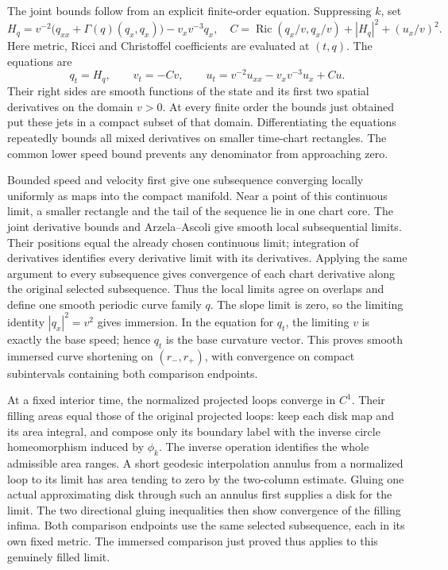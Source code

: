 The joint bounds follow from an explicit finite-order equation.
Suppressing $k$, set
\[
 H_q=v^{-2}\bigl(q_{xx}+\Gamma(q)(q_x,q_x)\bigr)
                  -v_xv^{-3}q_x,
 \quad C=\operatorname{Ric}(q_x/v,q_x/v)
                  +|H_q|^2+(u_x/v)^2.
\]
Here metric, Ricci and Christoffel coefficients are evaluated
at $(t,q)$.  The equations are
\[
 q_t=H_q,\qquad v_t=-Cv,\qquad
 u_t=v^{-2}u_{xx}-v_xv^{-3}u_x+Cu.
\]
Their right sides are smooth functions of the state and its
first two spatial derivatives on the domain $v>0$.
At every finite order the bounds just obtained put these jets
in a compact subset of that domain.  Differentiating the
equations repeatedly bounds all mixed derivatives on smaller
time-chart rectangles.  The common lower speed bound prevents
any denominator from approaching zero.

Bounded speed and velocity first give one subsequence converging
locally uniformly as maps into the compact manifold.  Near a
point of this continuous limit, a smaller rectangle and the
tail of the sequence lie in one chart core.  The joint derivative
bounds and Arzela--Ascoli give smooth local subsequential limits.
Their positions equal the already chosen continuous limit;
integration of derivatives identifies every derivative limit
with its derivatives.  Applying the same argument to every
subsequence gives convergence of each chart derivative along
the original selected subsequence.  Thus the local limits agree
on overlaps and define one smooth periodic curve family $q$.
The slope limit is zero, so the limiting identity
$|q_x|^2=v^2$ gives immersion.  In the equation for $q_t$,
the limiting $v$ is exactly the base speed; hence $q_t$ is
the base curvature vector.  This proves smooth immersed
curve shortening on $(r_-,r_+)$, with convergence on compact
subintervals containing both comparison endpoints.

At a fixed interior time, the normalized projected loops converge
in $C^1$.  Their filling areas equal those of the original
projected loops: keep each disk map and its area integral, and
compose only its boundary label with the inverse circle
homeomorphism induced by $\phi_k$.  The inverse operation
identifies the whole admissible area ranges.  A short geodesic
interpolation annulus from a normalized loop to its limit has
area tending to zero by the two-column estimate.  Gluing one
actual approximating disk through such an annulus first supplies
a disk for the limit.  The two directional gluing inequalities
then show convergence of the filling infima.  Both comparison
endpoints use the same selected subsequence, each in its own
fixed metric.  The immersed comparison just proved thus applies
to this genuinely filled limit.

